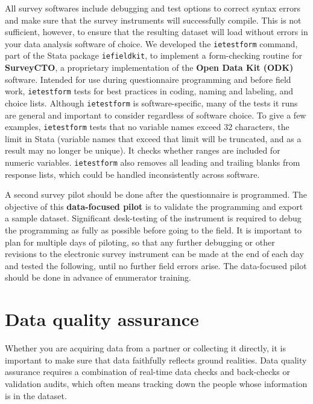 All survey softwares include debugging and test options
to correct syntax errors and make sure that the survey instruments will successfully compile.
This is not sufficient, however, to ensure that the resulting dataset
will load without errors in your data analysis software of choice.
We developed the \texttt{ietestform} command,
part of the Stata package \texttt{iefieldkit},
to implement a form-checking routine for \textbf{SurveyCTO},
a proprietary implementation of the \textbf{Open Data Kit (ODK)} software.
Intended for use during questionnaire programming and before field work,
\texttt{ietestform} tests for best practices in coding, naming and labeling, and choice lists.
Although \texttt{ietestform} is software-specific,
many of the tests it runs are general and important to consider regardless of software choice.
To give a few examples, \texttt{ietestform} tests that no variable names exceed
32 characters, the limit in Stata (variable names that exceed that limit will
be truncated, and as a result may no longer be unique).
It checks whether ranges are included for numeric variables.
\texttt{ietestform} also removes all leading and trailing blanks from response lists,
which could be handled inconsistently across software.

A second survey pilot should be done after the questionnaire is programmed.
The objective of this \textbf{data-focused pilot}
is to validate the programming and export a sample dataset.
Significant desk-testing of the instrument is required to debug the programming
as fully as possible before going to the field.
It is important to plan for multiple days of piloting,
so that any further debugging or other revisions to the electronic survey instrument
can be made at the end of each day and tested the following, until no further field errors arise.
The data-focused pilot should be done in advance of enumerator training.

\section{Data quality assurance}

Whether you are acquiring data from a partner or collecting it directly,
it is important to make sure that data faithfully reflects ground realities.
Data quality assurance requires a combination of real-time data checks
and back-checks or validation audits, which often means tracking down
the people whose information is in the dataset.

